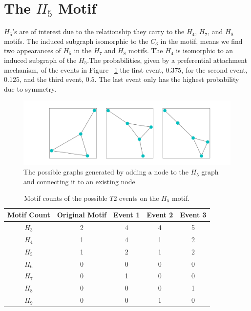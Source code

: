 \FloatBarrier


\section{The \texorpdfstring{$H_{5}$}{H5} Motif}
$H_{5}$'s are of interest due to the relationship they carry to the $H_{4}$, $H_{7}$, and $H_{8}$ motifs. The induced subgraph isomorphic to the $C_3$ in the motif, means we find two appearances of
$H_{5}$ in the $H_{7}$ and $H_{8}$ motifs. The $H_{4}$ is isomorphic to an induced subgraph of the $H_{5}$.The probabilities, given by 
 a preferential attachment mechanism, of the events
  in Figure ~\ref{fig:H5T2} the first event, $0.375$, for the second event, $0.125$, and the third event, $0.5$. The last event
only has the highest probability due to symmetry.

\begin{figure}[!ht]
    \includegraphics[width=12cm]{Images/H5_evolution.png}
    \centering
    \caption{The possible graphs generated by adding a node to the $H_{5}$ graph 
    and connecting it to an existing node}
    \label{fig:H5T2}
\end{figure}
\FloatBarrier

\begin{table}
    \centering
    \begin{tabular}{||c c c c c||} 
    \hline
    Motif Count & Original Motif & Event 1 & Event 2 & Event 3\\ [0.5ex] 
    \hline\hline
    $H_{3}$ & 2 & 4 & 4 & 5\\ 
    \hline
    $H_{4}$ & 1 & 4 & 1 & 2\\
    \hline
    $H_{5}$ & 1 & 2 & 1 & 2\\
    \hline
    $H_{6}$ & 0 & 0 & 0 & 0 \\
    \hline
    $H_{7}$ & 0 & 1 & 0 & 0 \\
    \hline
    $H_{8}$ & 0 & 0 & 0 & 1\\
    \hline
    $H_{9}$ & 0 & 0 & 1 & 0\\
    \hline
   \end{tabular}
   \caption{Motif counts of the possible $T2$ events on the $H_{5}$ motif.}
    \label{table:3}
\end{table}



